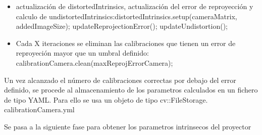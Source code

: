 \begin{itemize}
\item actualización de distortedIntrinsics, actualización del error de reproyección y calculo de undistortedIntrinsics:distortedIntrinsics.setup(cameraMatrix, addedImageSize);  updateReprojectionError();   updateUndistortion();

\item Cada X iteraciones se eliminan las calibraciones que tienen un error de reproyeción mayor que un umbral definido:       calibrationCamera.clean(maxReprojErrorCamera);
        
\end{itemize}
      
Un vez alcanzado el número de calibraciones correctas por debajo del error definido, se procede al almacenamiento de los parametros calculados en un fichero de tipo YAML. Para ello se usa un objeto de tipo cv::FileStorage. calibrationCamera.yml

Se pasa a la siguiente fase para obtener los parametros intrinsecos del proyector

